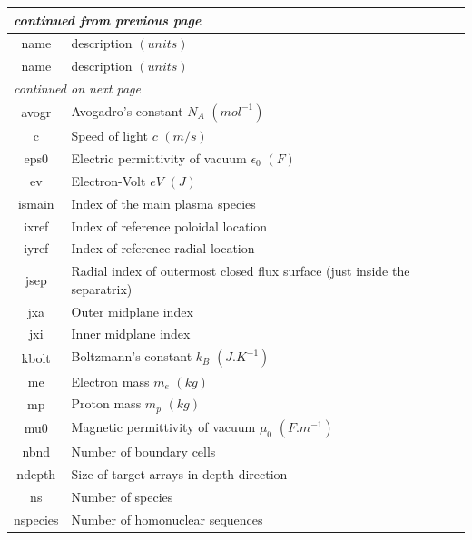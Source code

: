 \documentclass[a4paper,10pt]{report}
\begin{document}
\begin{center}
  \begin{longtable}{|c|l|}
    \hline
    \multicolumn{2}{|l|}{\small\sl continued from previous page} \\
    \hline name & description $(units)$ \\
    \hline \endhead
    \hline name & description $(units)$ \\
    \hline \endfirsthead
    \hline
    \multicolumn{2}{|l|}{\small\sl continued on next page} \\
    \hline \endfoot
    \endlastfoot
    avogr \index{b2plot, avogr}  & Avogadro's constant $N_A$ $(mol^{-1})$ \\
    c \index{b2plot, c}      & Speed of light $c$ $(m/s)$ \\
    eps0 \index{b2plot, eps0}   & Electric permittivity of vacuum $\epsilon_0$ $(F)$ \\
    ev \index{b2plot, ev}     & Electron-Volt $eV$ $(J)$ \\
    ismain \index{b2plot, ismain} & Index of the main plasma species \\
    ixref \index{b2plot, ixref}    & Index of reference poloidal location \\
    iyref \index{b2plot, iyref}    & Index of reference radial location \\
    jsep \index{b2plot, jsep}  & Radial index of outermost closed flux surface (just inside the separatrix) \\
    jxa \index{b2plot, jxa}    & Outer midplane index \\
    jxi \index{b2plot, jxi}    & Inner midplane index \\
    kbolt \index{b2plot, kbolt}  & Boltzmann's constant $k_B$ $(J.K^{-1})$ \\
    me \index{b2plot, me}     & Electron mass $m_e$ $(kg)$ \\
    mp \index{b2plot, mp}     & Proton mass $m_p$ $(kg)$ \\
    mu0 \index{b2plot, mu0}    & Magnetic permittivity of vacuum $\mu_0$ $(F.m^{-1})$ \\
    nbnd \index{b2plot, nbnd}   & Number of boundary cells \\
    ndepth \index{b2plot, ndepth} & Size of target arrays in depth direction \\
    ns \index{b2plot, ns}     & Number of species \\
    nspecies \index{b2plot, nspecies}     & Number of homonuclear sequences \\

\end{longtable}
\end{center}
\end{document}
